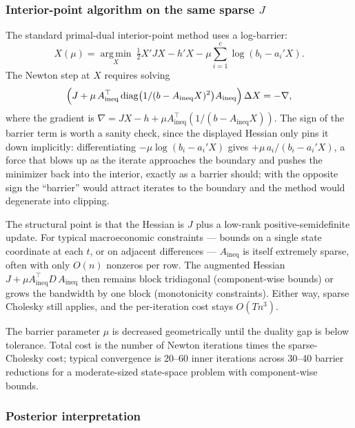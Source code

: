 \documentclass[11pt]{article}
\newcommand{\diag}{\operatorname{diag}}
\newcommand{\argmin}{\operatorname*{arg\,min}}
\begin{document}
\subsubsection{Interior-point algorithm on the same sparse $J$}

The standard primal-dual interior-point method uses a log-barrier:
\begin{equation}
X(\mu)=\argmin_X\ \tfrac12 X'JX-h'X-\mu\sum_{i=1}^{c}\log(b_i-a_i'X).
\end{equation}
The Newton step at $X$ requires solving
\begin{equation}
\Bigl(J+\mu\,A_{\text{ineq}}^\top\diag\bigl(1/(b-A_{\text{ineq}}X)^2\bigr)A_{\text{ineq}}\Bigr)\,\Delta X
=-\nabla,
\label{eq:newton}
\end{equation}
where the gradient is
$\nabla=JX-h+\mu A_{\text{ineq}}^\top(1/(b-A_{\text{ineq}}X))$.
The sign of the barrier term is worth a sanity check, since the
displayed Hessian only pins it down implicitly: differentiating
$-\mu\log(b_i-a_i'X)$ gives $+\mu\,a_i/(b_i-a_i'X)$, a force that
blows up as the iterate approaches the boundary and pushes the
minimizer back into the interior, exactly as a barrier should; with
the opposite sign the ``barrier'' would attract iterates to the
boundary and the method would degenerate into clipping.

The structural point is that the Hessian is $J$ plus a low-rank
positive-semidefinite update.  For typical macroeconomic
constraints --- bounds on a single state coordinate at each $t$, or
on adjacent differences --- $A_{\text{ineq}}$ is itself extremely
sparse, often with only $O(n)$ nonzeros per row.  The augmented
Hessian $J+\mu A_{\text{ineq}}^\top D\,A_{\text{ineq}}$ then remains
block tridiagonal (component-wise bounds) or grows the bandwidth by
one block (monotonicity constraints).  Either way, sparse Cholesky
still applies, and the per-iteration cost stays $O(Tn^3)$.

The barrier parameter $\mu$ is decreased geometrically until the
duality gap is below tolerance.  Total cost is the number of Newton
iterations times the sparse-Cholesky cost; typical convergence is
20--60 inner iterations across 30--40 barrier reductions for a
moderate-sized state-space problem with component-wise bounds.

\subsubsection{Posterior interpretation}
\end{document}
